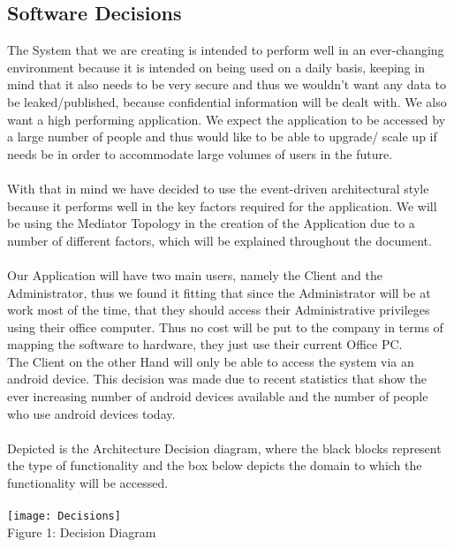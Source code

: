 \documentclass{article}
\begin{document}
\subsection{Software Decisions}
The System that we are creating is intended to perform well in an ever-changing environment because it is intended on being used on a daily basis, keeping in mind that it also needs to be very secure and thus we wouldn't want any data to be leaked/published, because confidential information will be dealt with. We also want a high performing application. We expect the application to be accessed by a large number of people and thus would like to be able to upgrade/ scale up if needs be in order to accommodate large volumes of users in the future.\\\\ With that in mind we have decided to use the event-driven architectural style because it performs well in the key factors required for the application. We will be using the Mediator Topology in the creation of the Application due to a number of different factors, which will be explained throughout the document.\\\\ Our Application will have two main users, namely the Client and the Administrator, thus we found it fitting that since the Administrator will be at work most of the time, that they should access their Administrative privileges using their office computer. Thus no cost will be put to the company in terms of mapping the software to hardware, they just use their current Office PC.\\ The Client on the other Hand will only be able to access the system via an android device. This decision was made due to recent statistics that show the ever increasing number of android devices available and the number of people who use android devices today.\\\\ Depicted is the Architecture Decision diagram, where the black blocks represent the type of functionality and the box below depicts the domain to which the functionality will be accessed.\\\\

\texttt{[image: Decisions]}\\
Figure 1: Decision Diagram
\pagebreak
\end{document}
